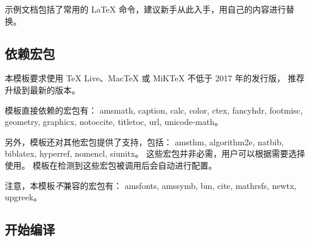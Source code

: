 \documentclass[a4paper]{ltxdoc}
\DeclareRobustCommand\pkg{\textsf}
\begin{document}
示例文档包括了常用的 \LaTeX{} 命令，建议新手从此入手，用自己的内容进行替换。


\subsection{依赖宏包}

本模板要求使用 TeX Live、MacTeX 或 MiKTeX 不低于 2017 年的发行版，
推荐升级到最新的版本。

模板直接依赖的宏包有：
\pkg{amsmath},
\pkg{caption},
\pkg{calc},
\pkg{color},
\pkg{ctex},
\pkg{fancyhdr},
\pkg{footmisc},
\pkg{geometry},
\pkg{graphicx},
\pkg{notoccite},
\pkg{titletoc},
\pkg{url},
\pkg{unicode-math}。

另外，模板还对其他宏包提供了支持，包括：
\pkg{amsthm},
\pkg{algorithm2e},
\pkg{natbib},
\pkg{biblatex},
\pkg{hyperref},
\pkg{nomencl},
\pkg{siunitx}。
这些宏包并非必需，用户可以根据需要选择使用。
模板在检测到这些宏包被调用后会自动进行配置。

注意，本模板\emph{不}兼容的宏包有：
\pkg{amsfonts},
\pkg{amssymb},
\pkg{bm},
\pkg{cite},
\pkg{mathrsfs},
\pkg{newtx},
\pkg{upgreek}。


\subsection{开始编译}
\end{document}
